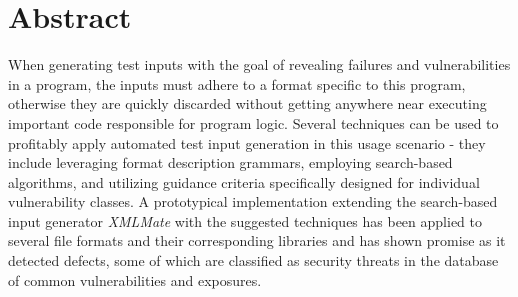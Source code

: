 \section*{Abstract}
When generating test inputs with the goal of revealing failures and vulnerabilities in a program, 
the inputs must adhere to a format specific to this program, otherwise they are 
quickly discarded without getting anywhere near executing important code responsible for program logic.
Several techniques can be used to profitably apply automated test input generation in this usage scenario -
they include leveraging format description grammars, employing search-based algorithms,
and utilizing guidance criteria specifically designed for individual vulnerability classes.
A prototypical implementation extending the search-based input generator \emph{XMLMate} with the suggested
techniques has been applied to several file formats and their corresponding libraries and has shown promise as
it detected defects, some of which are classified as security threats in the database of common
vulnerabilities and exposures. 
